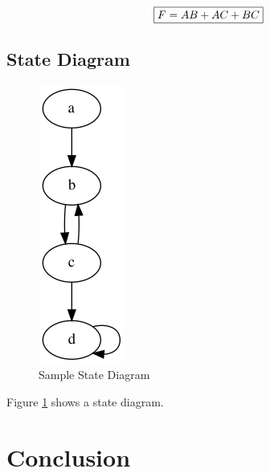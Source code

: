 \documentclass[10pt]{IEEEtran} %
\begin{document}
\[\framebox{\(F = AB + AC + BC\)}\]

\subsection{State Diagram}

\begin{figure}[h]
  \centering
  \includegraphics[scale=0.5]{my-diagram.png}
  \caption{Sample State Diagram}
  \label{fig:state-diagram}
\end{figure}

Figure \ref{fig:state-diagram} shows a state diagram.

\section{Conclusion}
\kant[42][1-3]
\end{document}
